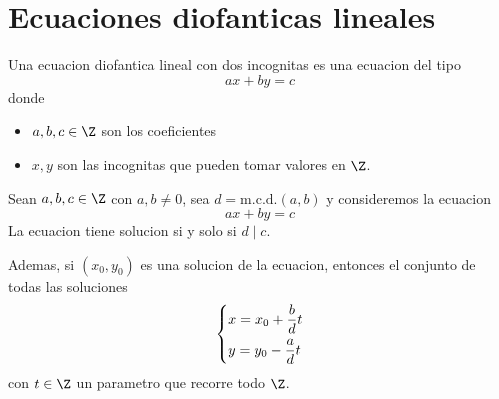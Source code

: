 \section{Ecuaciones diofanticas lineales}
\begin{definition}
	Una ecuacion diofantica lineal con dos incognitas es una ecuacion del tipo
	\[
		ax + by = c
	\]
	donde
	\begin{itemize}
		\item \(a,b,c \in \Z \) son los coeficientes
		\item \(x,y \) son las incognitas que pueden tomar valores en \(\Z \).
	\end{itemize}
\end{definition}

\begin{theorem}
	Sean \(a,b,c \in \Z \) con \(a,b \neq 0\), sea \(d = \mathrm{m.c.d.}(a,b) \) y consideremos la ecuacion
	\[
		ax + by = c
	\]
	La ecuacion tiene solucion si y solo si \(d \mid c \).

	Ademas, si \((x_0, y_0 )\) es una solucion de la ecuacion, entonces el conjunto de todas las soluciones
	\[
		\begin{dcases}
			x = x_0 + \frac{b}{d} t \\
			y = y_0 - \frac{a }{d }t
		\end{dcases}
	\] con \(t \in \Z \) un parametro que recorre todo \(\Z \).
\end{theorem}
